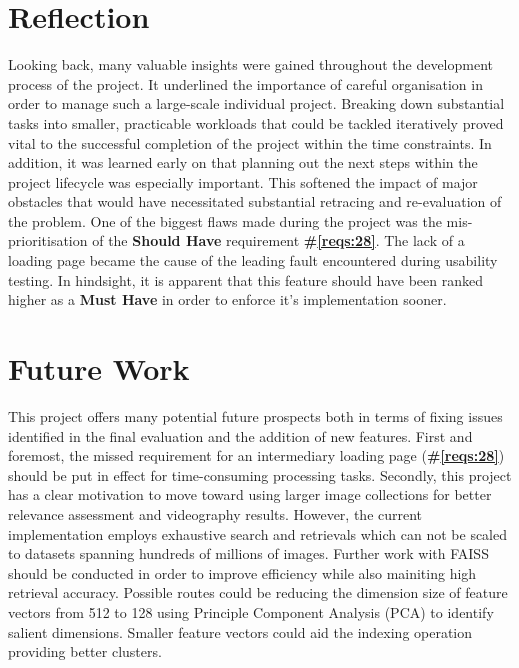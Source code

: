 \documentclass{l4proj}
\begin{document}
\section{Reflection}
Looking back, many valuable insights were gained throughout the development process of the project. It underlined the importance of careful organisation in order to manage such a large-scale individual project. Breaking down substantial tasks into smaller, practicable workloads that could be tackled iteratively proved vital to the successful completion of the project within the time constraints. In addition, it was learned early on that planning out the next steps within the project lifecycle was especially important. This softened the impact of major obstacles that would have necessitated substantial retracing and re-evaluation of the problem. One of the biggest flaws made during the project was the mis-prioritisation of the \textbf{Should Have} requirement \textbf{\#\ref{reqs:28}}. The lack of a loading page became the cause of the leading fault encountered during usability testing. In hindsight, it is apparent that this feature should have been ranked higher as a \textbf{Must Have} in order to enforce it's implementation sooner.


\section{Future Work}
\label{sec:future_work}
This project offers many potential future prospects both in terms of fixing issues identified in the final evaluation and the addition of new features. First and foremost, the missed requirement for an intermediary loading page (\textbf{\#\ref{reqs:28}}) should be put in effect for time-consuming processing tasks. Secondly, this project has a clear motivation to move toward using larger image collections for better relevance assessment and videography results. However, the current implementation employs exhaustive search and retrievals which can not be scaled to datasets spanning hundreds of millions of images. Further work with FAISS should be conducted in order to improve efficiency while also mainiting high retrieval accuracy. Possible routes could be reducing the dimension size of feature vectors from 512 to 128 using Principle Component Analysis (PCA) to identify salient dimensions. Smaller feature vectors could aid the indexing operation providing better clusters.
\end{document}
